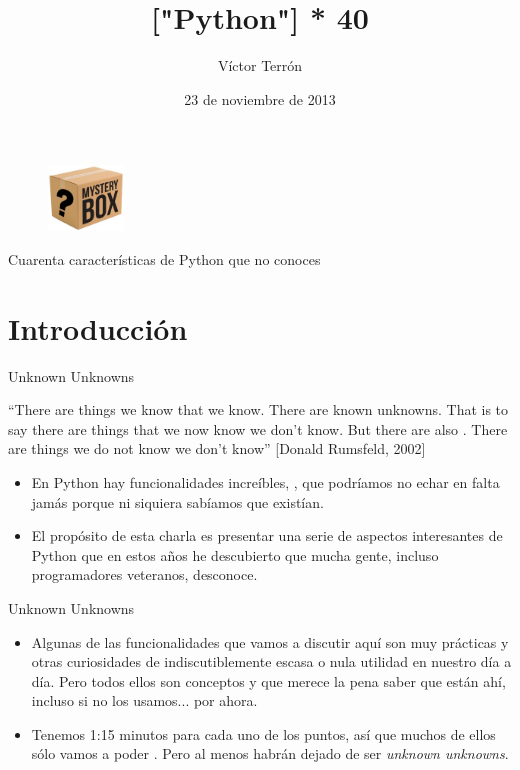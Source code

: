\documentclass[14pt]{beamer}
\title{["Python"] * 40}
\author{Víctor Terrón}
\date{23 de noviembre de 2013}
\institute{IAA-CSIC}
\begin{document}
\begin{frame}
  \titlepage

  \begin{figure}
    \vspace{-0.5cm}
    \includegraphics[width=2cm]{pics/mistery-box.jpg}
  \end{figure}

  \footnotesize
  \begin{center}
    Cuarenta características de Python que  no conoces
  \end{center}

\end{frame}

\section{Introducción}

\begin{frame}{Unknown Unknowns}
  \small
  \begin{block}{}
    \centering
    ``There are things we know that we know. There are known
    unknowns. That is to say there are things that we now know we
    don't know. But there are also . There
    are things we do not know we don't know'' [Donald Rumsfeld, 2002]
  \end{block}

  \small
  \begin{itemize}
    \item En Python hay funcionalidades increíbles,
     , que
     podríamos no echar en falta jamás porque ni siquiera sabíamos
     que existían.
    \item El propósito de esta charla es presentar una serie de
      aspectos interesantes de Python que en estos años he descubierto
      que mucha gente, incluso programadores veteranos, desconoce.
  \end{itemize}
\end{frame}

\begin{frame}{Unknown Unknowns}
  \begin{itemize}
    \item Algunas de las funcionalidades que vamos a discutir aquí son
      muy prácticas y otras curiosidades de indiscutiblemente escasa o
      nula utilidad en nuestro día a día. Pero todos ellos son
      conceptos  y que merece la pena
      saber que están ahí, incluso si no los usamos... por ahora.
    \item Tenemos 1:15 minutos para cada uno de los puntos, así que
      muchos de ellos sólo vamos a poder . Pero al menos habrán dejado de ser \emph{unknown
      unknowns}.
  \end{itemize}
\end{frame}
\end{document}

